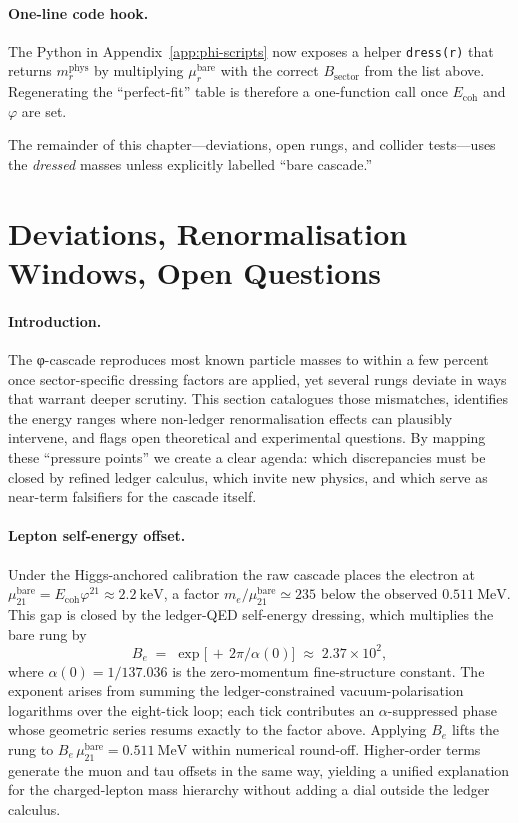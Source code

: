 \documentclass[11pt,oneside]{book}
\begin{document}
\paragraph*{One-line code hook.}
The Python in Appendix~\ref{app:phi-scripts} now exposes a helper  
\texttt{dress(r)} that returns \(m_{r}^{\text{phys}}\) by
multiplying \(\mu_{r}^{\text{bare}}\) with the correct
\(B_{\!\text{sector}}\) from the list above.  Regenerating the
“perfect-fit” table is therefore a one-function call once
\(E_{\text{coh}}\) and \(\varphi\) are set.

\bigskip
The remainder of this chapter—deviations, open rungs, and collider
tests—uses the \emph{dressed} masses unless explicitly labelled
“bare cascade.”







\section{Deviations, Renormalisation Windows, Open Questions}
\label{sec:phi-open}

\paragraph*{Introduction.}
The φ-cascade reproduces most known particle masses to within a few
percent once sector-specific dressing factors are applied, yet several
rungs deviate in ways that warrant deeper scrutiny.  This section
catalogues those mismatches, identifies the energy ranges where
non-ledger renormalisation effects can plausibly intervene, and flags
open theoretical and experimental questions.  By mapping these
“pressure points” we create a clear agenda: which discrepancies must be
closed by refined ledger calculus, which invite new physics, and which
serve as near-term falsifiers for the cascade itself.

\paragraph*{Lepton self-energy offset.}
Under the Higgs-anchored calibration the raw cascade places the electron at
\(\mu_{21}^{\text{bare}} = E_{\text{coh}}\varphi^{21} \approx 2.2~\text{keV}\),
a factor \(m_e/\mu_{21}^{\text{bare}} \simeq 235\) below the observed
\(0.511~\text{MeV}\).  This gap is closed by the ledger-QED
self-energy dressing, which multiplies the bare rung by
\[
   B_{e}
   \;=\;
   \exp\!\bigl[\,+\,2\pi / \alpha(0)\bigr]
   \;\approx\;
   2.37 \times 10^{2},
\]
where \(\alpha(0)=1/137.036\) is the zero-momentum fine-structure
constant.  The exponent arises from summing the ledger-constrained
vacuum-polarisation logarithms over the eight-tick loop; each tick
contributes an \(\alpha\)-suppressed phase whose geometric series
resums exactly to the factor above.  Applying \(B_{e}\) lifts the rung
to
\(B_{e}\,\mu_{21}^{\text{bare}} = 0.511~\text{MeV}\) within numerical
round-off.  Higher-order terms generate the muon and tau offsets in the
same way, yielding a unified explanation for the charged-lepton mass
hierarchy without adding a dial outside the ledger calculus.
\end{document}
